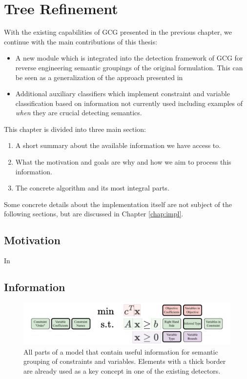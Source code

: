 \chapter{Tree Refinement}
\label{chap:tree}

	With the existing capabilities of \ac{GCG} presented in the previous chapter, we continue with the main contributions of this thesis:
	
	\begin{itemize}
		\item A new module which is integrated into the detection framework of \ac{GCG} for reverse engineering semantic groupings of the original formulation. This can be seen as a generalization of the approach presented in \cite{salvagninDetectingSemanticGroups2016}
		\item Additional auxiliary classifiers which implement constraint and variable classification based on information not currently used including examples of \textit{when} they are crucial detecting semantics.
	\end{itemize}

	This chapter is divided into three main section:
	
	\begin{enumerate}
		\item A short summary about the available information we have access to.
		\item What the motivation and goals are why and how we aim to process this information.
		\item The concrete algorithm and its most integral parts.
	\end{enumerate}
	
	Some concrete details about the implementation itself are not subject of the following sections, but are discussed in Chapter \ref{chap:impl}.

	\clearpage

	\section{Motivation}
	
		In \cite{salvagninDetectingSemanticGroups2016}
	
		\clearpage

	\section{Information}
	
		\begin{figure}[ht!]
			\centering
			\includegraphics[scale=0.8]{Bilder/DrawIO/model_information}
			\caption{All parts of a model that contain useful information for semantic grouping of constraints and variables. Elements with a thick border are already used as a key concept in one of the existing detectors.}
			\label{fig:tree:information}
		\end{figure}
		

